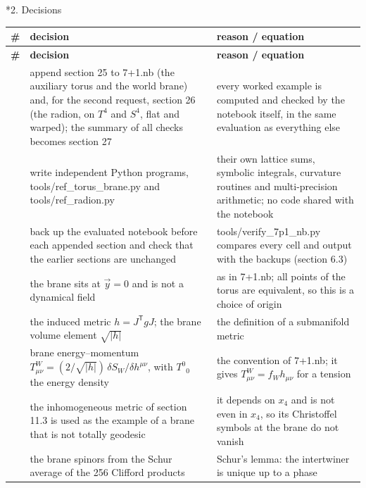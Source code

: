 \documentclass[10pt,a4paper]{article}
\makeatletter
\renewcommand\section{\@startsection{section}{1}{\z@}{-3.5ex \@plus -1ex \@minus -.2ex}{2.3ex \@plus.2ex}{\normalfont\Large\bfseries\raggedright}}
\makeatother
\begin{document}
\section*{2. Decisions}
{\footnotesize
\begin{longtable}{>{\raggedright\arraybackslash}p{}>{\raggedright\arraybackslash}p{}>{\raggedright\arraybackslash}p{}}
\toprule
\textbf{\#} & \textbf{decision} & \textbf{reason / equation} \\
\midrule\endfirsthead
\toprule
\textbf{\#} & \textbf{decision} & \textbf{reason / equation} \\
\midrule\endhead
\endfoot
\bottomrule\endlastfoot
1 & append section 25 to 7+1.nb (the auxiliary torus and the world brane) and, for the second request, section 26 (the radion, on $T^4$ and $S^4$, flat and warped); the summary of all checks becomes section 27 & every worked example is computed and checked by the notebook itself, in the same evaluation as everything else \\
2 & write independent Python programs, tools/ref\_torus\_brane.py and tools/ref\_radion.py & their own lattice sums, symbolic integrals, curvature routines and multi-precision arithmetic; no code shared with the notebook \\
3 & back up the evaluated notebook before each appended section and check that the earlier sections are unchanged & tools/verify\_7p1\_nb.py compares every cell and output with the backups (section 6.3) \\
4 & the brane sits at $\vec y=0$ and is not a dynamical field & as in 7+1.nb; all points of the torus are equivalent, so this is a choice of origin \\
5 & the induced metric $h=J^{\mathsf T}gJ$; the brane volume element $\sqrt{|h|}$ & the definition of a submanifold metric \\
6 & brane energy–momentum $T^W_{\mu\nu}=(2/\sqrt{|h|})\,\delta S_W/\delta h^{\mu\nu}$, with $T^0{}_0$ the energy density & the convention of 7+1.nb; it gives $T^W_{\mu\nu}=f_Wh_{\mu\nu}$ for a tension \\
7 & the inhomogeneous metric of section 11.3 is used as the example of a brane that is not totally geodesic & it depends on $x_4$ and is not even in $x_4$, so its Christoffel symbols at the brane do not vanish \\
8 & the brane spinors from the Schur average of the 256 Clifford products & Schur’s lemma: the intertwiner is unique up to a phase \\

\end{longtable}}
\end{document}
